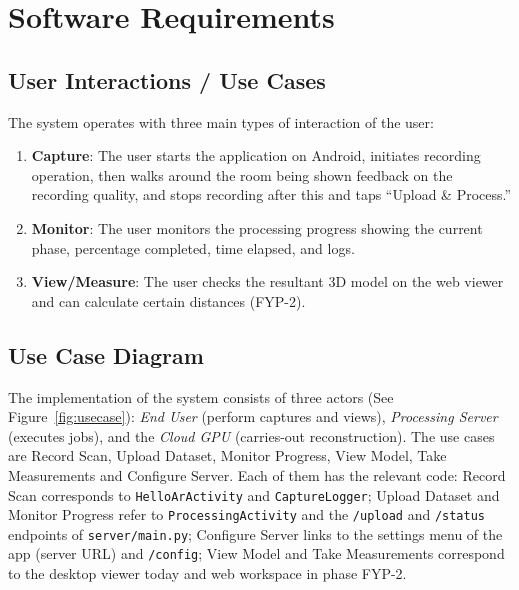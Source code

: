 \chapter{Software Requirements}

\section{User Interactions / Use Cases}
The system operates with three main types of interaction of the user:
\begin{enumerate}
    \item \textbf{Capture}: The user starts the application on Android, initiates recording operation, then walks around the room being shown feedback on the recording quality, and stops recording after this and taps ``Upload \& Process.''
    \item \textbf{Monitor}: The user monitors the processing progress showing the current phase, percentage completed, time elapsed, and logs.
    \item \textbf{View/Measure}: The user checks the resultant 3D model on the web viewer and can calculate certain distances (FYP-2).
\end{enumerate}

\section{Use Case Diagram}
The implementation of the system consists of three actors (See Figure~\ref{fig:usecase}): \emph{End User} (perform captures and views), \emph{Processing Server} (executes jobs), and the \emph{Cloud GPU} (carries-out reconstruction). The use cases are Record Scan, Upload Dataset, Monitor Progress, View Model, Take Measurements and Configure Server. Each of them has the relevant code: Record Scan corresponds to \texttt{HelloArActivity} and \texttt{CaptureLogger}; Upload Dataset and Monitor Progress refer to \texttt{ProcessingActivity} and the \texttt{/upload} and \texttt{/status} endpoints of \texttt{server/main.py}; Configure Server links to the settings menu of the app (server URL) and \texttt{/config}; View Model and Take Measurements correspond to the desktop viewer today and web workspace in phase FYP-2.

\newcommand{\bsactor}[3]{%
  \begin{scope}[shift={(#1,#2)}]
    \draw (0,0.95) circle (0.2);
    \draw (0,0.75) -- (0,0.05);
    \draw (-0.35,0.5) -- (0.35,0.5);
    \draw (0,0.05) -- (-0.3,-0.45);
    \draw (0,0.05) -- (0.3,-0.45);
    \node[align=center] at (0,-0.85) {#3};
  \end{scope}}

